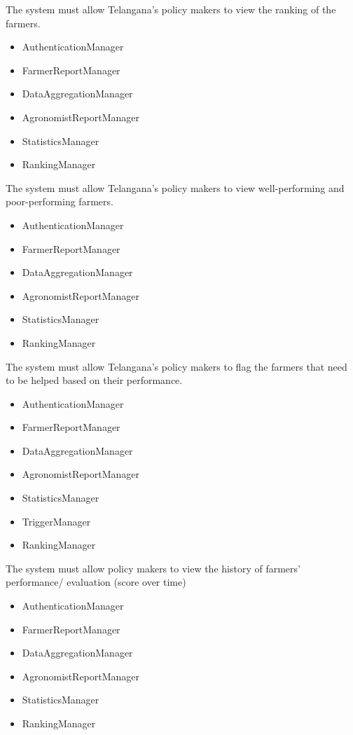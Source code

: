 \begin{itemize}
\begin{itemize}
\end{itemize}
 The system must allow Telangana’s policy makers to view the ranking of the farmers.
\begin{itemize}

\item AuthenticationManager
\item FarmerReportManager
\item DataAggregationManager
\item AgronomistReportManager
\item StatisticsManager
\item RankingManager

\end{itemize}
 The system must allow Telangana’s policy makers to view well-performing and poor-performing farmers.
\begin{itemize}

\item AuthenticationManager
\item FarmerReportManager
\item DataAggregationManager
\item AgronomistReportManager
\item StatisticsManager
\item RankingManager

\end{itemize}
 The system must allow Telangana’s policy makers to flag the farmers that need to be helped based on their performance.
\begin{itemize}

\item AuthenticationManager
\item FarmerReportManager
\item DataAggregationManager
\item AgronomistReportManager
\item StatisticsManager
\item TriggerManager
\item RankingManager

\end{itemize}
 The system must allow policy makers to view the history of farmers’ performance/ evaluation (score over time)
\begin{itemize}

\item AuthenticationManager
\item FarmerReportManager
\item DataAggregationManager
\item AgronomistReportManager
\item StatisticsManager
\item RankingManager


\end{itemize}
\end{itemize}
